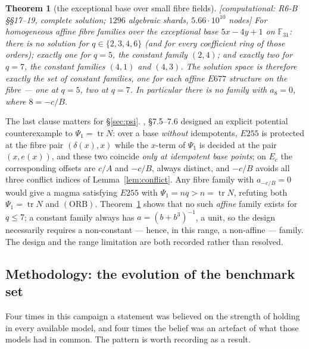 \documentclass[11pt]{article}
\theoremstyle{plain}
\newtheorem{theorem}{Theorem}[section]
\theoremstyle{definition}
\theoremstyle{remark}
\numberwithin{equation}{section}
\newcommand{\F}{\mathbb{F}}
\newcommand{\tr}{\operatorname{tr}}
\newcommand{\statusbox}[1]{{\small\sloppy\textsf{[#1]}}}
\newcommand{\COMP}[1]{\statusbox{computational: #1}}
\begin{document}
\begin{theorem}[the exceptional base over small fibre fields]\label{thm:F7}
\COMP{R6-B \S\S17--19, complete solution; $1296$ algebraic shards,
$5.66\cdot10^{10}$ nodes}
For homogeneous affine fibre families over the exceptional base
$5x-4y+1$ on $\F_{31}$: there is no solution for $q\in\{2,3,4,6\}$ (and for every
coefficient ring of those orders); exactly one for $q = 5$, the constant family
$(2,4)$; and exactly two for $q = 7$, the constant families $(4,1)$ and $(4,3)$.
The solution space is therefore \emph{exactly} the set of constant families, one
for each affine $E677$ structure on the fibre --- one at $q=5$, two at $q=7$.
In particular there is no family with $a_{8} = 0$, where $8 = -c/B$.
\end{theorem}

The last clause matters for \S\ref{sec:psi}. \cite{R6A}, \S7.5--7.6 designed an
explicit potential counterexample to $\Psi_1 = \tr N$: over a base \emph{without}
idempotents, $E255$ is protected at the fibre pair $(\delta(x),x)$ while the
$x$-term of $\Psi_1$ is decided at the pair $(x,e(x))$, and these two coincide
\emph{only at idempotent base points}; on $E_c$ the corresponding offsets are
$c/A$ and $-c/B$, always distinct, and $-c/B$ avoids all three conflict indices
of Lemma~\ref{lem:conflict}. Any fibre family with $a_{-c/B} = 0$ would give a
magma satisfying $E255$ with $\Psi_1 = nq > n = \tr N$, refuting both
$\Psi_1 = \tr N$ and $(\mathrm{ORB})$. Theorem~\ref{thm:F7} shows that no such
\emph{affine} family exists for $q\le7$; a constant family always has
$a = (b+b^3)^{-1}$, a unit, so the design necessarily requires a non-constant ---
hence, in this range, a non-affine --- family. The design and the range limitation
are both recorded rather than resolved.

\subsection{Methodology: the evolution of the benchmark set}\label{sec:benchmarks}

Four times in this campaign a statement was believed on the strength of holding in
every available model, and four times the belief was an artefact of what those
models had in common. The pattern is worth recording as a result.
\end{document}
